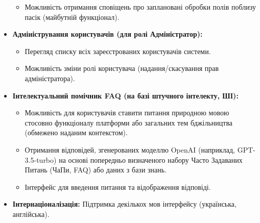 \begin{itemize}
\begin{itemize}
            \item Можливість отримання сповіщень про заплановані обробки полів поблизу пасік (майбутній функціонал).
        \end{itemize}
    \item \textbf{Адміністрування користувачів (для ролі Адміністратор):}
        \begin{itemize}
            \item Перегляд списку всіх зареєстрованих користувачів системи.
            \item Можливість зміни ролі користувача (надання/скасування прав адміністратора).
        \end{itemize}
    \item \textbf{Інтелектуальний помічник FAQ (на базі штучного інтелекту, ШІ):}
        \begin{itemize}
            \item Можливість для користувачів ставити питання природною мовою стосовно функціоналу платформи або загальних тем бджільництва (обмежено наданим контекстом).
            \item Отримання відповідей, згенерованих моделлю OpenAI (наприклад, GPT-3.5-turbo) на основі попередньо визначеного набору Часто Задаваних Питань (ЧаПи, FAQ) або даних з бази знань.
            \item Інтерфейс для введення питання та відображення відповіді.
        \end{itemize}
    \item \textbf{Інтернаціоналізація:} Підтримка декількох мов інтерфейсу (українська, англійська).
\end{itemize}

